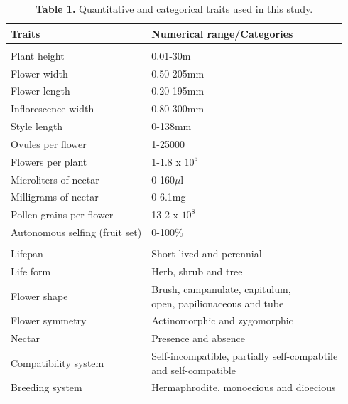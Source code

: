 \documentclass[
  12pt,
  a4paper,
]{article}
\begin{document}
\begin{table}

\caption{\label{tab:unnamed-chunk-1}\textbf{Table 1.} Quantitative and categorical traits used in this study.}
\centering
\fontsize{12}{14}\selectfont
\begin{tabular}[t]{ll}
\toprule
\textbf{Traits} & \textbf{Numerical range/Categories}\\
\midrule
\addlinespace[0.3em]
\multicolumn{2}{l}{\textbf{Quantitative}}\\
\hspace{1em}Plant height & 0.01-30m\\
\hspace{1em}Flower width & 0.50-205mm\\
\hspace{1em}Flower length & 0.20-195mm\\
\hspace{1em}Inflorescence width & 0.80-300mm\\
\hspace{1em}Style length & 0-138mm\\
\hspace{1em}Ovules per flower & 1-25000\\
\hspace{1em}Flowers per plant & 1-1.8 x $10^5$\\
\hspace{1em}Microliters of nectar & 0-160$\mu$l\\
\hspace{1em}Milligrams of nectar & 0-6.1mg\\
\hspace{1em}Pollen grains per flower & 13-2 x $10^8$\\
\hspace{1em}Autonomous selfing (fruit set) & 0-100$\%$\\
\addlinespace[0.3em]
\multicolumn{2}{l}{\textbf{Categorical}}\\
\hspace{1em}Lifepan & Short-lived and perennial\\
\hspace{1em}Life form & Herb, shrub and tree\\
\hspace{1em}Flower shape & \makecell[l]{Brush, campanulate, capitulum,\\ open, papilionaceous and tube}\\
\hspace{1em}Flower symmetry & Actinomorphic and zygomorphic\\
\hspace{1em}Nectar & Presence and absence\\
\hspace{1em}Compatibility system & \makecell[l]{Self-incompatible, partially self-compabtile \\ and self-compatible}\\
\hspace{1em}Breeding system & Hermaphrodite, monoecious and dioecious\\
\bottomrule
\end{tabular}
\end{table}
\end{document}
